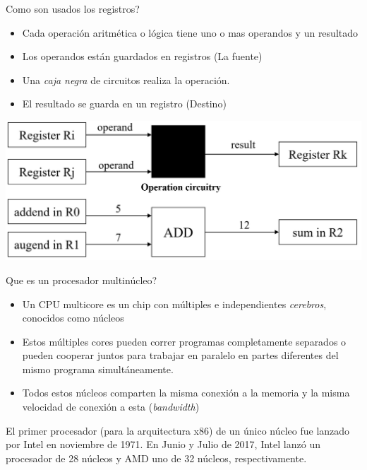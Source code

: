 \documentclass[11pt]{beamer}
\begin{document}
		\begin{frame}{Como son usados los registros?}
			\begin{itemize}
				\item Cada operación aritmética o lógica tiene uno o mas operandos y un resultado
				\item Los operandos están guardados en registros (La fuente)
				\item Una \textit{caja negra} de circuitos realiza la operación.
				\item El resultado se guarda en un registro (Destino)
			\end{itemize}
			
			\includegraphics[scale=0.75]{registros.jpg}
		\end{frame}
		\begin{frame}{Que es un procesador multinúcleo?}
			\begin{itemize}
				\item Un CPU multicore es un chip con múltiples e independientes \textit{cerebros}, conocidos como núcleos
				\item Estos múltiples cores pueden correr programas completamente separados o pueden cooperar juntos para trabajar en paralelo en partes diferentes del mismo programa simultáneamente.
				\item Todos estos núcleos comparten la misma conexión a la memoria y la misma velocidad de conexión a esta (\textit{bandwidth})
			\end{itemize}
			El primer procesador (para la arquitectura x86) de un único núcleo fue lanzado por Intel en noviembre de 1971. En Junio y Julio de 2017, Intel lanzó un procesador de 28 núcleos y AMD uno de 32 núcleos, respectivamente.
		\end{frame}
\end{document}
